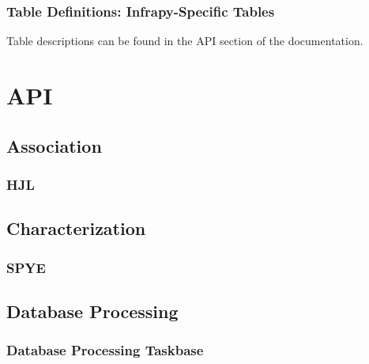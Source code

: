 \documentclass[letterpaper,10pt,english]{sphinxmanual}
\begin{document}
\subsubsection{Table Definitions: Infrapy-Specific Tables}
\label{\detokenize{schema:table-definitions-infrapy-specific-tables}}
Table descriptions can be found in the API section of the documentation.


\section{API}
\label{\detokenize{infrapy:api}}\label{\detokenize{infrapy:id1}}\label{\detokenize{infrapy::doc}}

\subsection{Association}
\label{\detokenize{infrapy.association:association}}\label{\detokenize{infrapy.association::doc}}

\subsubsection{HJL}
\label{\detokenize{infrapy.association:hjl}}

\subsection{Characterization}
\label{\detokenize{infrapy.characterization:characterization}}\label{\detokenize{infrapy.characterization::doc}}

\subsubsection{SPYE}
\label{\detokenize{infrapy.characterization:spye}}

\subsection{Database Processing}
\label{\detokenize{infrapy.database:database-processing}}\label{\detokenize{infrapy.database::doc}}

\subsubsection{Database Processing Taskbase}
\label{\detokenize{infrapy.database.taskbase:database-processing-taskbase}}\label{\detokenize{infrapy.database.taskbase::doc}}
\end{document}
